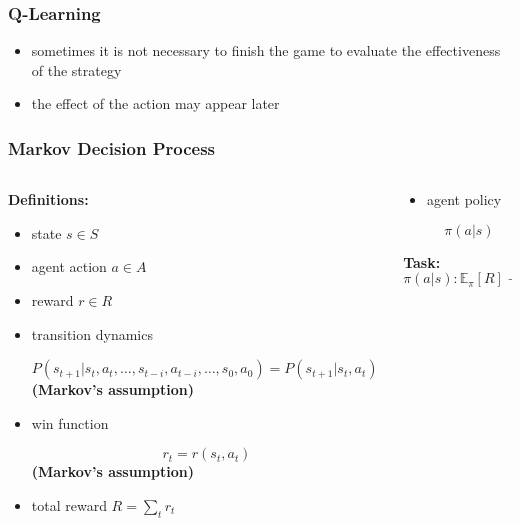 \documentclass[fullscreen=true, bookmarks=true, hyperref={pdfencoding=unicode}]{beamer}
\begin{document}

\begin{frame}
  \frametitle{Q-Learning}

  \begin{itemize}
    \item sometimes it is not necessary to finish the game to evaluate the effectiveness of the strategy
    \item the effect of the action may appear later
   \end{itemize}
\end{frame}


\begin{frame}
  \frametitle{Markov Decision Process}

\begin{columns}
    \begin{column}{.6\paperwidth}
      {\bf Definitions:}
      \begin{itemize}
        \item state $s \in S$
        \item agent action $a \in A$
        \item reward $r \in R$
        \item transition dynamics

         $ P(s_{t+1} | s_t, a_t, \dots, s_{t-i}, a_{t-i}, \dots, s_0, a_0) = P(s_{t+1} | s_t, a_t)$
         {\bf (Markov's assumption)}

        \item win function

         $$ r_{t} = r(s_t, a_t)$$ {\bf (Markov's assumption)}
        \item total reward $R = \sum\limits_t r_t $
      \end{itemize}
    \end{column}
    \begin{column}{.3\paperwidth}

      \begin{itemize}
        \item agent policy

        $$ \pi (a | s) $$
      \end{itemize}
      {\bf Task:}
      $$ \pi (a | s): \mathbb{E}_\pi [R] \to \max $$
    \end{column}
  \end{columns}
\end{frame}

\end{document}
